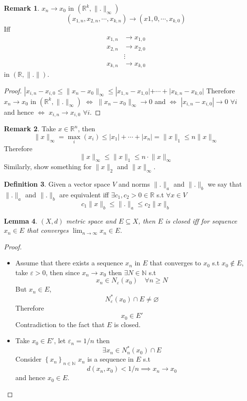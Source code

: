 \documentclass[11pt,a4paper]{article}
\theoremstyle{definition}
\newtheorem{definition}{Definition}[section]
\newtheorem{remark}[definition]{Remark}
\theoremstyle{plain}
\newtheorem{lemma}[definition]{Lemma}
\theoremstyle{remark}
\newcommand{\R}{\mathbb{R}}
\newcommand{\N}{\mathbb{N}}
\renewcommand{\set}[1]{\left\{ #1 \right\}}
\newcommand{\norm}[1]{\lVert #1 \rVert}
\begin{document}
\begin{remark}
    $x_n \to x_0$ in $(\R^k, \norm{.}_\infty)$ 
    $$(x_{1,n}, x_{2,n}, \cdots, x_{k,n}) \to (x{1,0}, \cdots, x_{k,0})$$
    Iff 
    \begin{align*}
        x_{1,n} &\to x_{1,0} \\
        x_{2,n} &\to x_{2,0} \\
        &\vdots \\
        x_{k,n} &\to x_{k,0} 
    \end{align*} 
    in $(\R, \norm{.})$. 
\end{remark}

\begin{proof}
    $|x_{i, n} - x_{i,0} \leq \norm{x_n - x_0}_\infty \leq |x_{1,n} - x_{1,0}| + \cdots + |x_{k,n} - x_{k,0}|$
    Therefore $x_n \to x_0$ in $(\R^k, \norm{.}_\infty)$ $\iff$ $\norm{x_n - x_0}_\infty \to 0$ and $\iff$ $|x_{i,n} - x_{i,0}| \to 0$ $\forall i$ and hence 
    $\iff$ $x_{i,n} \to x_{i,0}$ $\forall i$. 
\end{proof}

\begin{remark}
    Take $x \in \R^n$, then 
    $$\norm{x}_\infty = \max_i (x_i) \leq |x_1| + \cdots + |x_n| = \norm{x}_1 \leq n \norm{x}_\infty$$
    Therefore 
    $$ \norm{x}_\infty \leq \norm{x}_1 \leq n \cdot \norm{x}_\infty$$
    Similarly, show something for $\norm{x}_2$ and $\norm{x}_\infty$. 
\end{remark}

\begin{definition}
    Given a vector space $V$ and norms $\norm{.}_a$ and $\norm{.}_b$ we say that $\norm{.}_a$ and $\norm{.}_b$ are 
    equivalent iff $\exists c_1, c_2 > 0 \in \R$ s.t $\forall x \in V$
    $$c_1 \norm{x}_b \leq \norm{.}_a \leq c_2 \norm{x}_b$$
\end{definition}

\begin{lemma}
    $(X,d)$ metric space and $E \subseteq X$, then $E$ is closed iff for sequence $x_n \in E$ that converges 
    $\lim_{n \to \infty} x_n \in E$. 
\end{lemma}

\begin{proof}
    \begin{itemize}
        \item[$\implies$] Assume that there exists a sequence $x_n$ in $E$ that converges to $x_0$ s.t $x_0 \not\in E$, 
        take $\varepsilon > 0$, then since $x_n \to x_0$ then $\exists N \in \N$ s.t 
        $$x_n \in N_\varepsilon (x_0) \quad \forall n \geq N$$
        But $x_n \in E$, 
        $$N_\varepsilon^*(x_0) \cap E \neq \varnothing$$
        Therefore 
        $$x_0 \in E'$$
        Contradiction to the fact that $E$ is closed. 

        \item Take $x_0 \in E'$, let $\varepsilon_n = 1/n$ then 
        $$\exists x_n \in N_n^* (x_0) \cap E$$
        Consider $\set{x_n}_{n \in \N}$ $x_n$ is a sequence in $E$ s.t 
        $$d(x_n, x_0) < 1/n \implies x_n \to x_0$$
        and hence $x_0 \in E$. 
    \end{itemize}
\end{proof}
\end{document}
